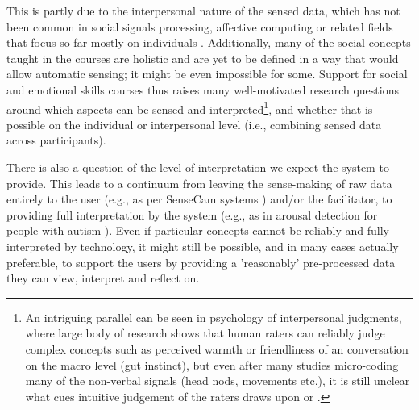 \documentclass[prodmode,acmtochi]{acmsmall}
\begin{document}
This is partly due to the interpersonal nature of the sensed data, which has not been common in social signals processing, affective computing or related fields that focus so far mostly on individuals \cite{Vinciarelli2012}. Additionally, many of the social concepts taught in the courses are holistic and are yet to be defined in a way that would allow automatic sensing; it might be even impossible for some. Support for social and emotional skills courses thus raises many well-motivated research questions around which aspects can be sensed and interpreted\footnote{An intriguing parallel can be seen in psychology of interpersonal judgments, where large body of research shows that human raters can reliably judge complex concepts such as perceived warmth or friendliness of an conversation on the macro level (gut instinct), but even after many studies micro-coding many of the non-verbal signals (head nods, movements etc.), it is still unclear what cues intuitive judgement of the raters draws upon \cite{Ambady2000} or \cite[p.299]{harrigan2008}.}, and whether that is possible on the individual or interpersonal level (i.e., combining sensed data across participants).

There is also a question of the level of interpretation we expect the system to provide. This leads to a continuum from leaving the sense-making of raw data entirely to the user (e.g., as per SenseCam systems \cite{Fleck2009}) and/or the facilitator, to providing full interpretation by the system (e.g., as in arousal detection for people with autism \cite{Picard2009}). Even if particular concepts cannot be reliably and fully interpreted by technology, it might still be possible, and in many cases actually preferable, to support the users by providing a 'reasonably' pre-processed data they can view, interpret and reflect on. 
\end{document}
